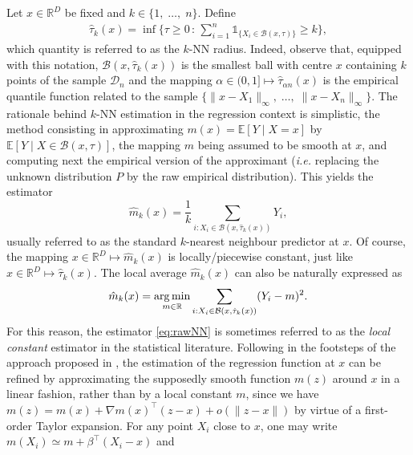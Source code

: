  Let $x\in \mathbb{R}^D$ be fixed and $k\in\{1,\; \ldots,\; n\}$. Define 
\begin{align*}
    \hat \tau_{k} (x) {=} \inf \{\tau\geq 0 \,:\, \sum_{i=1} ^ n  \mathds{1}_{\{X_i \in \mathcal{B}(x,\tau)\}}  \geq  k \},
\end{align*}
which quantity is referred to as the $k$-NN radius. Indeed, observe that, equipped with this notation, $\mathcal{B}(x, \hat \tau_{k} (x))$ is the smallest ball with centre $x$ containing $k$ points of the sample $\mathcal{D}_n$ and the mapping $\alpha\in (0,1] \mapsto \hat \tau_{\alpha n} (x)  $ is the empirical quantile function related to the sample $\{\|x-X_1\|_\infty ,\; \ldots,\; \|x-X_n\|_\infty \}$. The rationale behind $k$-NN estimation in the regression context is simplistic, the method consisting in approximating $m(x)=\mathbb{E}[Y\mid X=x]$ by $\mathbb{E}[Y\mid X\in \mathcal{B}(x, \tau)]$, the mapping $m$ being assumed to be smooth at $x$, and computing next the empirical version of the approximant (\textit{i.e.} replacing the unknown distribution $P$ by the raw empirical distribution). This yields the estimator
\begin{equation}\label{eq:rawNN}
 \hat m_{k} (x)  = \frac 1 k  \sum_{i : X_i \in \mathcal{B}(x, \hat{\tau}_k(x))}  Y_i     ,
\end{equation} 
usually referred to as the standard $k$-nearest neighbour predictor at $x$. Of course, the mapping $x\in \mathbb{R}^D\mapsto \hat m_{k} (x) $ is locally/piecewise constant, just like $x\in \mathbb{R}^D\mapsto \hat{\tau}_{k} (x) $.
The local average $ \hat m_{k} (x) $ can also be naturally expressed as
\begin{equation}
  \hat m_{k}  (x)=   \argmin_{ m  \in \mathbb{R}} \sum_{i : X_i \in \mathcal{B}(x, \hat{\tau}_k(x))} (Y_i - m )^2 .\label{loco}
\end{equation}
For this reason, the estimator \eqref{eq:rawNN} is sometimes referred to as the \textit{local constant} estimator in the statistical literature. Following in the footsteps of the approach proposed in \cite{fanDesignadaptiveNonparametricRegression1992}, the estimation of the regression function at $x$ can be refined by approximating the supposedly smooth function $m(z)$ around $x$ in a linear fashion, rather than by a local constant $m$, since we have $m(z) = m(x) + \nabla m(x)^\intercal (z-x) + o(\lVert z-x \rVert)$ by virtue of a first-order Taylor expansion. For any point $X_i $ close to $x$, one may write $m(X_i) \simeq  m + \beta^\intercal (X_i-x)$ and
